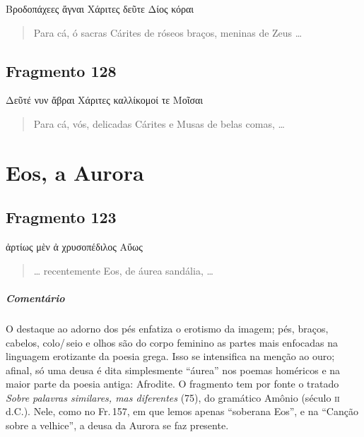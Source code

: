 \begin{gkverse}
Βροδοπάχεες ἄγναι Χάριτες δεῦτε Δίος κόραι
\end{gkverse}

\begin{verse}
Para cá, ó sacras Cárites de róseos braços, meninas de Zeus \ldots{}
\end{verse}\bigskip


\section{Fragmento 128} 

\begin{gkverse}
Δεῦτέ νυν ἄβραι Χάριτες καλλίκομοί τε Μοῖσαι
\end{gkverse}

\begin{verse}
Para cá, vós, delicadas Cárites e Musas de belas comas, \ldots{}
\end{verse}


\chapter{Eos, a Aurora}

\section{Fragmento 123}

\begin{gkverse}
ἀρτίως μὲν ἀ χρυσοπέδιλος Αὔως
\end{gkverse}

\begin{verse}
\ldots{} recentemente Eos, de áurea sandália, \ldots{}
\end{verse}

\medskip

{\paragraph{Comentário} O destaque ao adorno dos pés enfatiza o erotismo da imagem; pés, braços,
cabelos, colo/\,seio e olhos são do corpo feminino as partes mais enfocadas na
linguagem erotizante da poesia grega. Isso se intensifica na menção ao ouro;
afinal, só uma deusa é dita simplesmente ``áurea'' nos poemas homéricos
e na maior parte da poesia antiga: Afrodite. O fragmento tem por fonte o
tratado \textit{Sobre palavras similares, mas diferentes} (75), do gramático Amônio
(século \textsc{ii} d.C.).
Nele, como no Fr.\,157, em que lemos apenas ``soberana Eos'', e na ``Canção sobre a velhice'', a deusa da Aurora se faz presente.}



